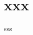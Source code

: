 \documentclass{beamer}
\begin{document}
\section{xxx}
\begin{frame}
	sss
\end{frame}
%
\end{document}
